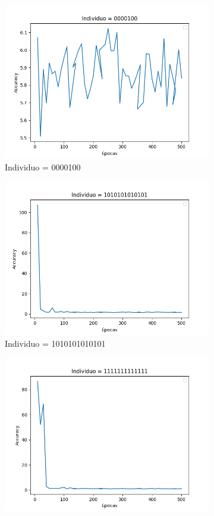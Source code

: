\begin{figure}[h!]
\begin{subfigure}[b]{0.47\linewidth}
 \includegraphics[width=.7\linewidth]{images/Figure_3.png}
\caption{Individuo = 0000100}
\label{fig:individuo_0000100}
\end{subfigure}
\begin{subfigure}[b]{0.47\linewidth}
 \includegraphics[width=.7\linewidth]{images/Figure_4.png}
\caption{Individuo = 1010101010101}
\label{fig:individuo_1010101010101}
\end{subfigure}
\begin{subfigure}[b]{0.47\linewidth}
 \includegraphics[width=.7\linewidth]{images/Figure_5.png}

\end{subfigure}
\end{figure}
